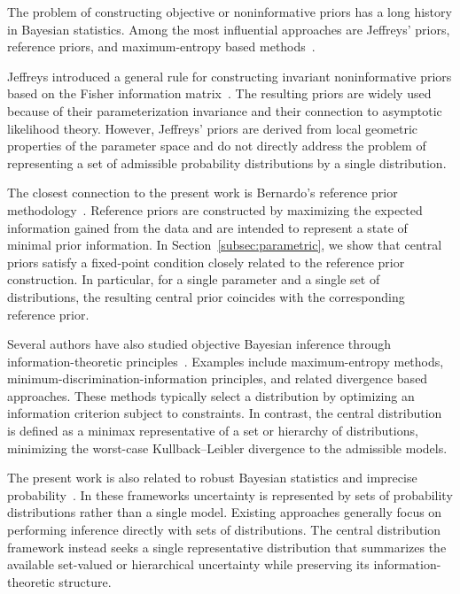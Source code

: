 The problem of constructing objective or noninformative priors has a long history in Bayesian statistics.
Among the most influential approaches are Jeffreys' priors, reference priors, and maximum-entropy based
methods~\cite{Jeffreys1946, Bernardo1979, jaynes1957}.

Jeffreys introduced a general rule for constructing invariant noninformative priors based on the Fisher information
matrix~\cite{Jeffreys1946}.
The resulting priors are widely used because of their parameterization invariance and their connection to asymptotic
likelihood theory.
However, Jeffreys' priors are derived from local geometric properties of the parameter space and do not directly
address the problem of representing a set of admissible probability distributions by a single distribution.

The closest connection to the present work is Bernardo's reference prior
methodology~\cite{BERNARDO200517, Bernardo1979}.
Reference priors are constructed by maximizing the expected information gained from the data and are intended to
represent a state of minimal prior information.
In Section~\ref{subsec:parametric}, we show that central priors satisfy a fixed-point condition closely related to
the reference prior construction.
In particular, for a single parameter and a single set of distributions, the resulting central prior coincides with
the corresponding reference prior.

Several authors have also studied objective Bayesian inference through information-theoretic
principles~\cite{jaynes1957, 10.1214/aoms/1177729694}.
Examples include maximum-entropy methods, minimum-discrimination-information principles, and related
divergence based approaches.
These methods typically select a distribution by optimizing an information criterion subject to constraints.
In contrast, the central distribution is defined as a minimax representative of a set or hierarchy of distributions,
minimizing the worst-case Kullback–Leibler divergence to the admissible models.

The present work is also related to robust Bayesian statistics and imprecise
probability~\cite{riosinsua2000robust, walley1991statistical}.
In these frameworks uncertainty is represented by sets of probability distributions rather than a single model.
Existing approaches generally focus on performing inference directly with sets of distributions.
The central distribution framework instead seeks a single representative distribution that summarizes the available
set-valued or hierarchical uncertainty while preserving its information-theoretic structure.

